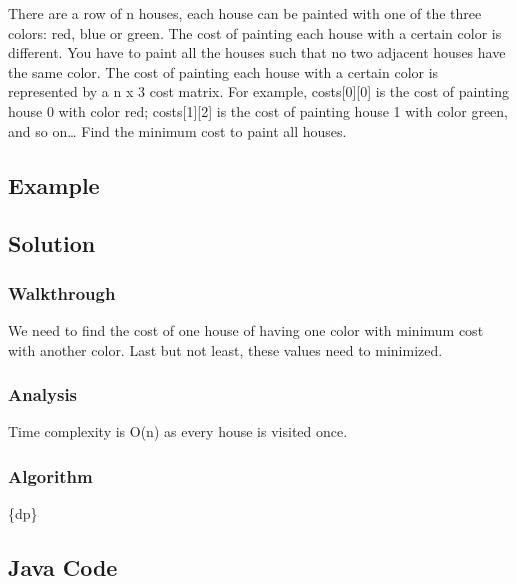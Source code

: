 \documentclass[]{book}
\begin{document}
There are a row of n houses, each house can be painted with one of the three colors: red, blue or green. The cost of
painting each house with a certain color is different. You have to paint all the houses such that no two adjacent
houses have the same color. The cost of painting each house with a certain color is represented by a n x 3 cost
matrix. For example, costs{[}0{]}{[}0{]} is the cost of painting house 0 with color red; costs{[}1{]}{[}2{]} is the cost of painting
house 1 with color green, and so on\ldots{} Find the minimum cost to paint all houses.

\hypertarget{example-28}{%
\subsection{Example}\label{example-28}}

\hypertarget{solution-22}{%
\subsection{Solution}\label{solution-22}}

\hypertarget{walkthrough-28}{%
\subsubsection{Walkthrough}\label{walkthrough-28}}

We need to find the cost of one house of having one color with minimum cost with another color. Last but not least,
these values need to minimized.

\hypertarget{analysis-31}{%
\subsubsection{Analysis}\label{analysis-31}}

Time complexity is O(n) as every house is visited once.

\hypertarget{algorithm-31}{%
\subsubsection{Algorithm}\label{algorithm-31}}

\{dp\}

\hypertarget{java-code-25}{%
\subsection{Java Code}\label{java-code-25}}
\end{document}
